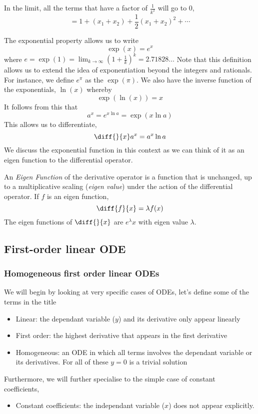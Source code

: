 \documentclass{article}
\begin{document}
In the limit, all the terms that have a factor of $\frac{1}{k^2}$ will go to $0$,
\[
    = 1 + (x_1 + x_2) + \frac{1}{2}(x_1 + x_2)^2 + \cdots
\]


The exponential property allows us to write
\[
    \exp(x) = e^x
\]
where $e = \exp(1) = \lim_{k \rightarrow \infty}(1+\frac{1}{k})^k = 2.71828\ldots$ Note that this definition allows us to extend the idea of exponentiation beyond the integers and rationals. 
For instance, we define $e^\pi$ as the $\exp(\pi)$. We also have the inverse function of the exponentials, $\ln(x)$ whereby
\[
  \exp(\ln(x)) = x  
\]
It follows from this that
\[
    a^x = e^{x \ln a} = \exp(x \ln a) 
\]
This allows us to differentiate,
\[
    \diff{}{x}a^x = a^x \ln a
\]
We discuss the exponential function in this context as we can think of it as an eigen function to the differential operator.

\begin{defi}
    An \emph{Eigen Function} of the derivative operator is a function that is unchanged, up to a multiplicative scaling (\emph{eigen value}) under the action of the differential operator. If $f$ is an eigen function,
    \[
        \diff{f}{x} = \lambda f(x)  
    \]
    The eigen functions of $\diff{}{x}$ are $e^\lambda x$ with eigen value $\lambda$.
\end{defi}

\subsection{First-order linear ODE}
\subsubsection{Homogeneous first order linear ODEs}
We will begin by looking at very specific cases of ODEs, let's define some of the terms in the title
\begin{itemize}
    \item Linear: the dependant variable ($y$) and its derivative only appear linearly
    \item First order: the highest derivative that appears in the first derivative
    \item Homogeneous: an ODE in which all terms involves the dependant variable or its derivatives. For all of these $y=0$ is a trivial solution
\end{itemize}
Furthermore, we will further specialise to the simple case of constant coefficients,\
\begin{itemize}
    \item Constant coefficients: the independant variable ($x$) does not appear explicitly.
\end{itemize}
\end{document}
